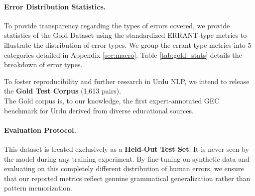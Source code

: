 \documentclass[11pt]{article}
\begin{document}
\paragraph{Error Distribution Statistics.}
To provide transparency regarding the types of errors covered, we provide statistics of the Gold-Dataset using the standardized ERRANT-type metrics \cite{errant} to illustrate the distribution of error types. We group the errant type metrics into 5 categories detailed in Appendix \ref{sec:macro}.
Table \ref{tab:gold_stats} details the breakdown of error types. 
\begin{table}[h]
\centering
\small
{}
\caption{Distribution of error types in the Gold Test Set (1,600 sentences), grouped by macro-grammatical categories.}
\label{tab:gold_stats}
\end{table}

To foster reproducibility and further research in Urdu NLP, we intend to release the \textbf{Gold Test Corpus} (1,613 pairs). 
\\The Gold corpus is, to our knowledge, the first expert-annotated GEC benchmark for Urdu derived from diverse educational sources.

\paragraph{Evaluation Protocol.}
This dataset is treated exclusively as a \textbf{Held-Out Test Set}. It is never seen by the model during any training experiment. By fine-tuning on synthetic data and evaluating on this completely different distribution of human errors, we ensure that our reported metrics reflect genuine grammatical generalization rather than pattern memorization.
\end{document}
